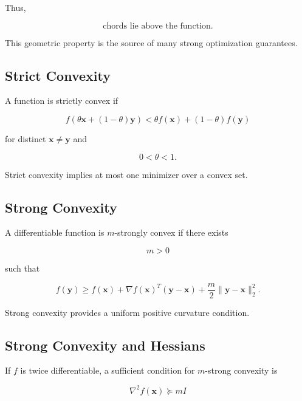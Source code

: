 Thus,

\[
\boxed{
\text{chords lie above the function}.
}
\]

This geometric property is the source of many strong optimization
guarantees.

\subsection{Strict Convexity}
\label{subsec:strict-convexity-convex-optimization}

A function is strictly convex if

\[
\boxed{
f
\left(
\theta\mathbf{x}
+
(1-\theta)\mathbf{y}
\right)
<
\theta f(\mathbf{x})
+
(1-\theta)f(\mathbf{y})
}
\]

for distinct \(\mathbf{x}\neq\mathbf{y}\) and

\[
0<\theta<1.
\]

Strict convexity implies at most one minimizer over a convex set.

\subsection{Strong Convexity}
\label{subsec:strong-convexity}

A differentiable function is \(m\)-strongly convex if there exists

\[
m>0
\]

such that

\[
\boxed{
f(\mathbf{y})
\geq
f(\mathbf{x})
+
\nabla f(\mathbf{x})^T
(\mathbf{y}-\mathbf{x})
+
\frac{m}{2}
\|
\mathbf{y}-\mathbf{x}
\|_2^2.
}
\]

Strong convexity provides a uniform positive curvature condition.

\subsection{Strong Convexity and Hessians}
\label{subsec:strong-convexity-hessian}

If \(f\) is twice differentiable, a sufficient condition for
\(m\)-strong convexity is

\[
\boxed{
\nabla^2f(\mathbf{x})
\succeq
mI
}
\]


